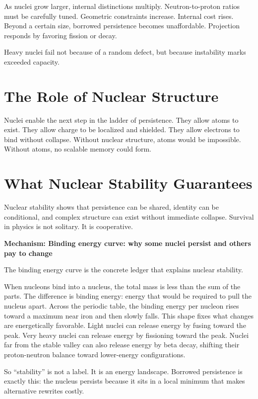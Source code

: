 \documentclass[11pt,twoside,openright]{book}
\newenvironment{mechanismboxpage}[1]
  {\par\medskip
   \noindent
   \begin{minipage}{\linewidth}
   \begin{framed}
   \noindent\textbf{Mechanism: #1}\par\medskip}
  {\end{framed}
   \end{minipage}
   \par\medskip}
\begin{document}
As nuclei grow larger, internal distinctions multiply. Neutron-to-proton ratios must be carefully tuned. Geometric constraints increase. Internal cost rises. Beyond a certain size, borrowed persistence becomes unaffordable. Projection responds by favoring fission or decay.

Heavy nuclei fail not because of a random defect, but because instability marks exceeded capacity.

\section*{The Role of Nuclear Structure}

Nuclei enable the next step in the ladder of persistence. They allow atoms to exist. They allow charge to be localized and shielded. They allow electrons to bind without collapse. Without nuclear structure, atoms would be impossible. Without atoms, no scalable memory could form.

\section*{What Nuclear Stability Guarantees}

Nuclear stability shows that persistence can be shared, identity can be conditional, and complex structure can exist without immediate collapse. Survival in physics is not solitary. It is cooperative.

\begin{mechanismboxpage}{Binding energy curve: why some nuclei persist and others pay to change}
The binding energy curve is the concrete ledger that explains nuclear stability.

When nucleons bind into a nucleus, the total mass is less than the sum of the parts. The difference is binding energy: energy that would be required to pull the nucleus apart. Across the periodic table, the binding energy per nucleon rises toward a maximum near iron and then slowly falls. This shape fixes what changes are energetically favorable. Light nuclei can release energy by fusing toward the peak. Very heavy nuclei can release energy by fissioning toward the peak. Nuclei far from the stable valley can also release energy by beta decay, shifting their proton-neutron balance toward lower-energy configurations.

So ``stability'' is not a label.
It is an energy landscape.
Borrowed persistence is exactly this: the nucleus persists because it sits in a local minimum that makes alternative rewrites costly.
\end{mechanismboxpage}
\end{document}
